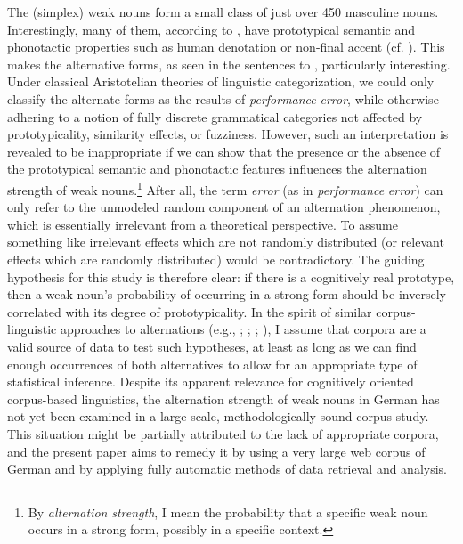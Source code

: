 \begin{styleMoutonTextAfterExample}
The (simplex) weak nouns form a small class of just over 450 masculine nouns. Interestingly, many of them, according to \citet{Köpcke1995}, have prototypical semantic and phonotactic properties such as human denotation or non-final accent (cf. ). This makes the alternative forms, as seen in the sentences  to , particularly interesting. Under classical Aristotelian theories of linguistic categorization, we could only classify the alternate forms as the results of \textit{performance} \textit{error}, while otherwise adhering to a notion of fully discrete grammatical categories not affected by prototypicality, similarity effects, or fuzziness. However, such an interpretation is revealed to be inappropriate if we can show that the presence or the absence of the prototypical semantic and phonotactic features influences the alternation strength of weak nouns.\footnote{By \textit{alternation} \textit{strength}, I mean the probability that a specific weak noun occurs in a strong form, possibly in a specific context.} After all, the term \textit{error} (as in \textit{performance} \textit{error}) can only refer to the unmodeled random component of an alternation phenomenon, which is essentially irrelevant from a theoretical perspective. To assume something like irrelevant effects which are not randomly distributed (or relevant effects which are randomly distributed) would be contradictory. The guiding hypothesis for this study is therefore clear: if there is a cognitively real prototype, then a weak noun’s probability of occurring in a strong form should be inversely correlated with its degree of prototypicality. In the spirit of similar corpus-linguistic approaches to alternations (e.g., \citealt{Gries2003}; \citealt{BresnanEtAl2007}; \citealt{NessetJanda2010}; \citealt{DivjakArppe2013}), I assume that corpora are a valid source of data to test such hypotheses, at least as long as we can find enough occurrences of both alternatives to allow for an appropriate type of statistical inference. Despite its apparent relevance for cognitively oriented corpus-based linguistics, the alternation strength of weak nouns in German has not yet been examined in a large-scale, methodologically sound corpus study. This situation might be partially attributed to the lack of appropriate corpora, and the present paper aims to remedy it by using a very large web corpus of German and by applying fully automatic methods of data retrieval and analysis.
\end{styleMoutonTextAfterExample}

